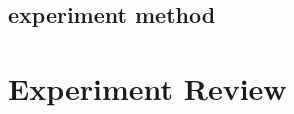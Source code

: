 \documentclass[paper=a4, fontsize=10pt, font=arial]{scrartcl} %
\numberwithin{equation}{section} %
\numberwithin{figure}{section} %
\numberwithin{table}{section} %
\begin{document}
\subsection{experiment method}

\section{Experiment Review}
\end{document}
